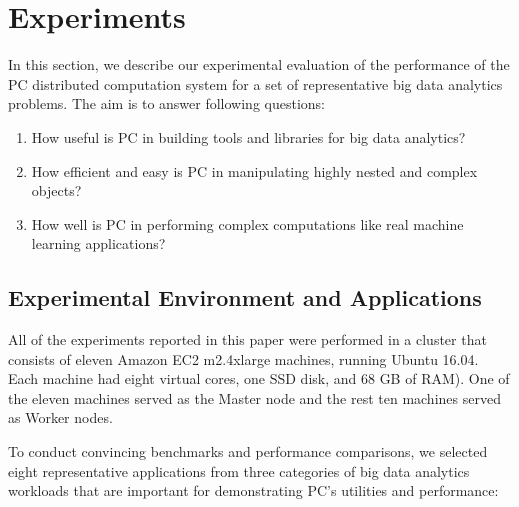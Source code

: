 
\section{Experiments}

In this section, we describe our experimental evaluation of the
performance of the PC distributed computation system for a set of
representative big data analytics problems. The aim is to answer
following questions:

\begin {enumerate}
\item How useful is PC in building tools and libraries for big data analytics?
\item How efficient and easy is PC in manipulating highly nested and complex objects?
\item How well is PC in performing complex computations like real
  machine learning applications?
\end {enumerate}

\subsection {Experimental Environment and Applications}

All of the experiments reported in this paper were performed in a
cluster that consists of eleven Amazon EC2 m2.4xlarge machines,
running Ubuntu 16.04. Each machine had eight virtual cores, one SSD
disk, and 68 GB of RAM). One of the eleven machines served as the Master
node and the rest ten machines served as Worker nodes.

\vspace{5pt}
To conduct convincing benchmarks and performance comparisons, we
selected eight representative applications from three categories
of big data analytics workloads that are important for demonstrating
PC's utilities and performance:

